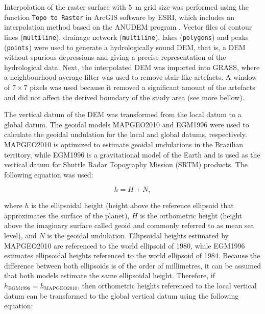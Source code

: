 
Interpolation of the raster surface with \SI{5}{\metre} grid size was performed using the function 
\texttt{Topo 
to Raster} in ArcGIS\textregistered{} software by ESRI, which includes an interpolation method based on the 
ANUDEM program \cite{Hutchinson1989}. Vector files of contour lines (\texttt{multiline}), 
drainage network (\texttt{multiline}), lakes (\texttt{polygons}) and peaks (\texttt{points}) were used to 
generate a 
hydrologically sound DEM, that is, a DEM without spurious depressions and giving a precise representation 
of the hydrological data. Next, the interpolated DEM was imported into GRASS, where a neighbourhood average 
filter was used to remove stair-like artefacts. A window of $7 \times 7$ pixels was used because it removed a 
significant amount of the artefacts and did not affect the derived boundary of the study area (see more 
bellow).

The vertical datum of the DEM was transformed from the local datum to a global datum. The geoidal models 
MAPGEO2010 \cite{IBGE2010a} and EGM1996 \cite{LemoineEtAl1998} were used to calculate the geoidal undulation 
for the local and global datums, respectively. MAPGEO2010 is optimized to estimate geoidal undulations in the 
Brazilian territory, while EGM1996 is a gravitational model of the Earth and is used as the vertical datum for 
Shuttle Radar Topography Mission (SRTM) products. The following equation was used:

\begin{equation}\label{eqn:geoidal}
 h = H + N,
\end{equation}

\noindent where $h$ is the ellipsoidal height (height above the reference ellipsoid that approximates the 
surface of the planet), $H$ is the orthometric height (height above the imaginary surface called geoid and 
commonly referred to as mean sea level), and $N$ is the geoidal undulation. Ellipsoidal heights estimated by 
MAPGEO2010 are referenced to the world ellipsoid of 1980, while EGM1996 estimates ellipsoidal heights 
referenced to the world ellipsoid of 1984. Because the difference between both ellipsoids is of the order of 
millimetres, it can be assumed that both models estimate the same ellipsoidal height. Therefore, if 
$h_{\text{EGM1996}} = h_{\text{MAPGEO2010}}$, then orthometric heights referenced to the local vertical datum 
can be transformed to the global vertical datum using the following equation:


